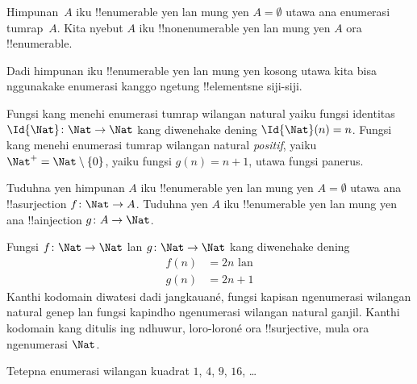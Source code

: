 \documentclass[../../../include/open-logic-section]{subfiles}
\begin{document}
\begin{defn}
  Himpunan~$A$ iku !!{enumerable} yen lan mung yen $A = \emptyset$
  utawa ana enumerasi tumrap~$A$. Kita nyebut $A$ iku !!{nonenumerable}
  yen lan mung yen $A$ ora !!{enumerable}.
\end{defn}

\begin{explain}
Dadi himpunan iku !!{enumerable} yen lan mung yen kosong utawa kita
bisa nggunakake enumerasi kanggo ngetung !!{element}sne siji-siji.
\end{explain}

\begin{ex}
Fungsi kang menehi enumerasi tumrap wilangan natural yaiku fungsi identitas
$\Id{\Nat} \colon \Nat \to \Nat$ kang diwenehake dening $\Id{\Nat}(n) = n$.
Fungsi kang menehi enumerasi tumrap wilangan natural \emph{positif}, yaiku $\Nat^+ =
\Nat \setminus \{0\}$, yaiku fungsi $g(n) = n + 1$,
utawa fungsi panerus.
\end{ex}

\begin{prob}
Tuduhna yen himpunan $A$ iku !!{enumerable} yen lan mung yen $A = \emptyset$
utawa ana !!a{surjection} $f\colon \Nat \to A$. Tuduhna yen $A$
iku !!{enumerable} yen lan mung yen ana !!a{injection} $g\colon A \to \Nat$.
\end{prob}

\begin{ex}
Fungsi $f\colon \Nat \to \Nat$ lan $g \colon \Nat \to \Nat$
kang diwenehake dening
\begin{align*}
  f(n) & = 2n \text{ lan}\\
  g(n) & = 2n+1
\end{align*}
Kanthi kodomain diwatesi dadi jangkauané, fungsi kapisan ngenumerasi wilangan natural genep
lan fungsi kapindho ngenumerasi wilangan natural ganjil.
Kanthi kodomain kang ditulis ing ndhuwur, loro-loroné ora !!{surjective},
mula ora ngenumerasi $\Nat$.
\end{ex}

\begin{prob}
Tetepna enumerasi wilangan kuadrat $1$, $4$, $9$, $16$, \dots
\end{prob}
\end{document}
